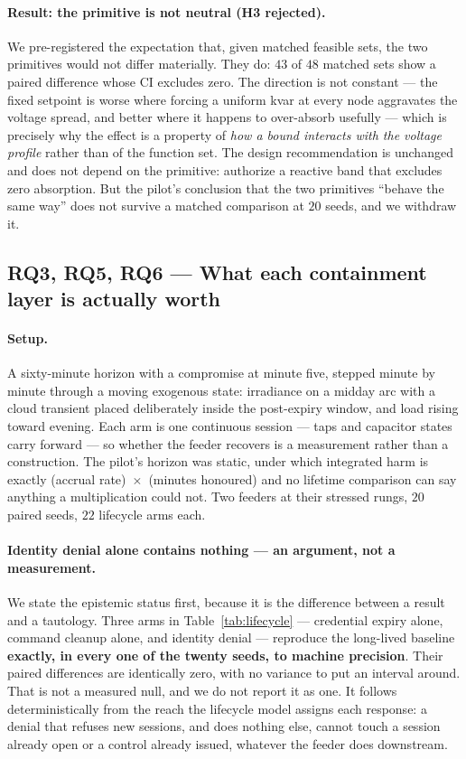 \paragraph{Result: the primitive is not neutral (H3 rejected).} We pre-registered the expectation
that, given matched feasible sets, the two primitives would not differ materially. They do: $43$
of $48$ matched sets show a paired difference whose CI excludes zero. The direction is not
constant --- the fixed setpoint is worse where forcing a uniform kvar at every node aggravates the
voltage spread, and better where it happens to over-absorb usefully --- which is precisely why the
effect is a property of \emph{how a bound interacts with the voltage profile} rather than of the
function set. The design recommendation is unchanged and does not depend on the primitive:
authorize a reactive band that excludes zero absorption. But the pilot's conclusion that the two
primitives ``behave the same way'' does not survive a matched comparison at $20$ seeds, and we
withdraw it.

\subsection{RQ3, RQ5, RQ6 --- What each containment layer is actually worth}

\paragraph{Setup.} A sixty-minute horizon with a compromise at minute five, stepped minute by
minute through a moving exogenous state: irradiance on a midday arc with a cloud transient placed
deliberately inside the post-expiry window, and load rising toward evening. Each arm is one
continuous session --- taps and capacitor states carry forward --- so whether the feeder recovers
is a measurement rather than a construction. The pilot's horizon was static, under which
integrated harm is exactly (accrual rate)~$\times$~(minutes honoured) and no lifetime comparison
can say anything a multiplication could not. Two feeders at their stressed rungs, $20$ paired
seeds, $22$ lifecycle arms each.

\paragraph{Identity denial alone contains nothing --- an argument, not a measurement.}
We state the epistemic status first, because it is the difference between a result and a
tautology. Three arms in Table~\ref{tab:lifecycle} --- credential expiry alone, command cleanup
alone, and identity denial --- reproduce the long-lived baseline \textbf{exactly, in every one of
the twenty seeds, to machine precision}. Their paired differences are identically zero, with no
variance to put an interval around. That is not a measured null, and we do not report it as one.
It follows deterministically from the reach the lifecycle model assigns each response: a denial
that refuses new sessions, and does nothing else, cannot touch a session already open or a control
already issued, whatever the feeder does downstream.

